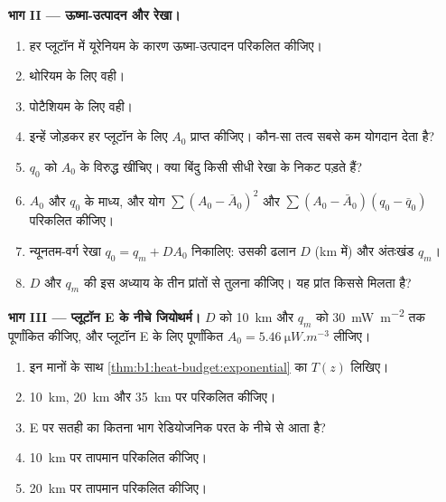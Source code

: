 \begin{problem}
\noindent\textbf{भाग II --- ऊष्मा-उत्पादन और रेखा।}
\begin{enumerate}[resume]
  \item हर प्लूटॉन में यूरेनियम के कारण ऊष्मा-उत्पादन परिकलित कीजिए।
  \item थोरियम के लिए वही।
  \item पोटैशियम के लिए वही।
  \item इन्हें जोड़कर हर प्लूटॉन के लिए $A_0$ प्राप्त कीजिए। कौन-सा तत्व सबसे कम योगदान देता है?
  \item $q_0$ को $A_0$ के विरुद्ध खींचिए। क्या बिंदु किसी सीधी रेखा के निकट पड़ते हैं?
  \item $A_0$ और $q_0$ के माध्य, और योग $\sum (A_0 - \bar A_0)^2$ और $\sum (A_0 - \bar A_0)(q_0 - \bar q_0)$ परिकलित कीजिए।
  \item न्यूनतम-वर्ग रेखा $q_0 = q_m + D A_0$ निकालिए: उसकी ढलान $D$ (\unit{km} में) और अंतःखंड $q_m$।
  \item $D$ और $q_m$ की इस अध्याय के तीन प्रांतों से तुलना कीजिए। यह प्रांत किससे मिलता है?
\end{enumerate}

\noindent\textbf{भाग III --- प्लूटॉन E के नीचे जियोथर्म।}
$D$ को \qty{10}{km} और $q_m$ को \qty{30}{mW.m^{-2}} तक पूर्णांकित कीजिए, और प्लूटॉन E के लिए पूर्णांकित $A_0 = \qty{5.46}{\micro W.m^{-3}}$ लीजिए।
\begin{enumerate}[resume]
  \item इन मानों के साथ \cref{thm:b1:heat-budget:exponential} का  $T(z)$ लिखिए।
  \item \qty{10}{km}, \qty{20}{km} और \qty{35}{km} पर  परिकलित कीजिए।
  \item E पर सतही  का कितना भाग रेडियोजनिक परत के नीचे से आता है?
  \item \qty{10}{km} पर तापमान परिकलित कीजिए।
  \item \qty{20}{km} पर तापमान परिकलित कीजिए।
\end{enumerate}


\end{problem}
